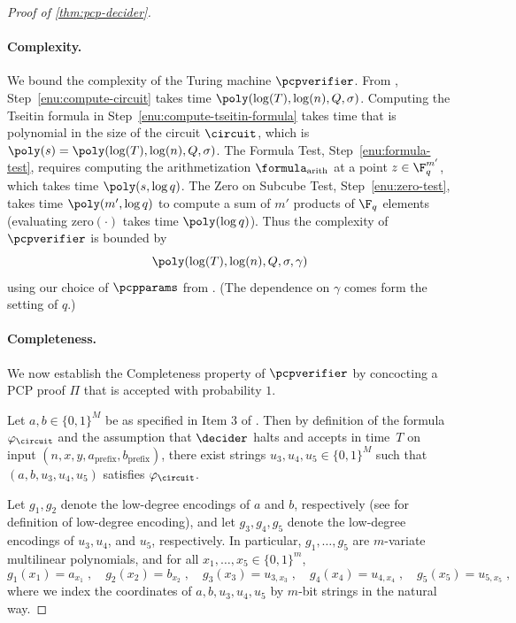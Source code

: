 \begin{proof}[Proof of \cref{thm:pcp-decider}]
\paragraph{Complexity.}
We bound the complexity of the Turing machine $\pcpverifier$.
From ,
Step~\ref{enu:compute-circuit} takes time $\poly(\log(T),\log(n),Q,\sigma)$.
Computing the Tseitin formula in Step~\ref{enu:compute-tseitin-formula} takes
time that is polynomial in the size of the circuit $\circuit$, which is
$\poly(s) = \poly(\log(T),\log(n),Q,\sigma)$.
The Formula Test, Step~\ref{enu:formula-test}, requires computing the
arithmetization $\formula_{\mathrm{arith}}$ at a point $z \in \F_q^{m'}$, which
takes time $\poly(s,\log q)$.
The Zero on Subcube Test, Step~\ref{enu:zero-test}, takes time $\poly(m',\log
q)$ to compute a sum of $m'$ products of $\F_q$ elements (evaluating
$\mathrm{zero}(\cdot)$ takes time $\poly(\log q)$).
Thus the complexity of $\pcpverifier$ is bounded by
\[
  \poly(\log(T),\log(n),Q,\sigma,\gamma)
\]
using our choice of $\pcpparams$ from . (The
dependence on $\gamma$ comes form the setting of $q$.) 
  
  
\paragraph{Completeness.}
We now establish the Completeness property of $\pcpverifier$ by concocting a PCP
proof $\Pi$ that is accepted with probability $1$.
  
Let $a,b \in \{0,1\}^M$ be as specified in Item 3 of .
Then by definition of the formula $\varphi_\circuit$ and the assumption that 
 $\decider$ halts and accepts in time~$T$ on input $(n, x, y,
    a_{\mathrm{prefix}}, b_{\mathrm{prefix}})$, there exist strings
$u_3,u_4,u_5 \in \{0,1\}^M$ such that $(a,b,u_3,u_4,u_5)$ satisfies
$\varphi_\circuit$.
  
Let $g_1,g_2$ denote the low-degree encodings of $a$ and $b$, respectively (see
 for definition of low-degree encoding), and let
$g_3, g_4, g_5$ denote the low-degree encodings of $u_3, u_4$, and
$u_5$, respectively.
In particular, $g_1,\ldots,g_5$ are $m$-variate multilinear polynomials, and for
all $x_1,\ldots,x_5 \in \{0,1\}^m$,
\begin{equation*}
  g_1(x_1) = a_{x_1}\;, \quad
  g_2(x_2) = b_{x_2}\;, \quad
  g_3(x_3) = u_{3,x_3}\;, \quad
  g_4(x_4) = u_{4,x_4}\;, \quad
  g_5(x_5) = u_{5,x_5}\;,
\end{equation*}
where we index the coordinates of $a,b,u_3,u_4,u_5$ by $m$-bit strings in the
natural way.


\end{proof}
